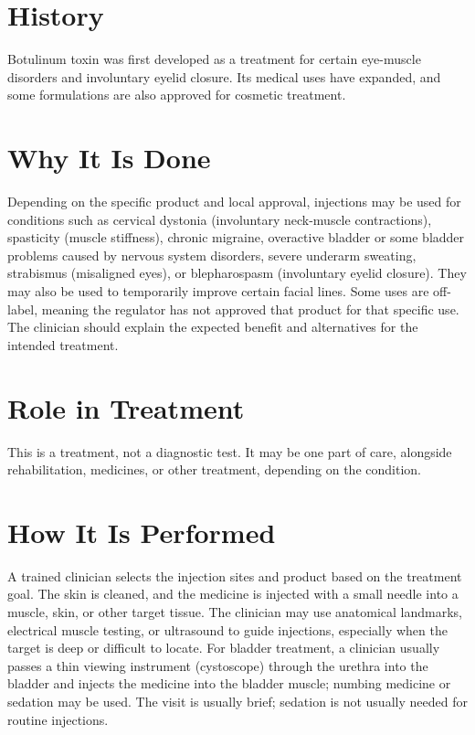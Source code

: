 \section*{History}
Botulinum toxin was first developed as a treatment for certain eye-muscle disorders and involuntary eyelid closure. Its medical uses have expanded, and some formulations are also approved for cosmetic treatment.

\section*{Why It Is Done}
Depending on the specific product and local approval, injections may be used for conditions such as cervical dystonia (involuntary neck-muscle contractions), spasticity (muscle stiffness), chronic migraine, overactive bladder or some bladder problems caused by nervous system disorders, severe underarm sweating, strabismus (misaligned eyes), or blepharospasm (involuntary eyelid closure). They may also be used to temporarily improve certain facial lines. Some uses are off-label, meaning the regulator has not approved that product for that specific use. The clinician should explain the expected benefit and alternatives for the intended treatment.

\section*{Role in Treatment}
This is a treatment, not a diagnostic test. It may be one part of care, alongside rehabilitation, medicines, or other treatment, depending on the condition.

\section*{How It Is Performed}
A trained clinician selects the injection sites and product based on the treatment goal. The skin is cleaned, and the medicine is injected with a small needle into a muscle, skin, or other target tissue. The clinician may use anatomical landmarks, electrical muscle testing, or ultrasound to guide injections, especially when the target is deep or difficult to locate. For bladder treatment, a clinician usually passes a thin viewing instrument (cystoscope) through the urethra into the bladder and injects the medicine into the bladder muscle; numbing medicine or sedation may be used. The visit is usually brief; sedation is not usually needed for routine injections.

